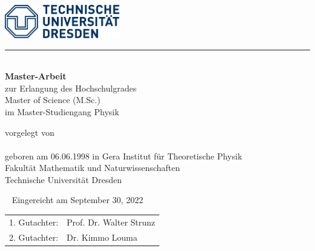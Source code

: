 \makeatletter
\thispagestyle{empty}
\begin{titlepage}
  \includegraphics[width=5cm]{figs/logo.pdf}
  \hrule
  \vspace{1em}

  {\centering
  \vspace*{5em}
  {\bfseries\Huge \@title\\}
  \vspace*{2em}
  {\Large\@subtitle}
    \vfill \vfill
    {\large {\bfseries Master-Arbeit} \\
      zur Erlangung des Hochschulgrades\\
      Master of Science (M.Sc.)\\
      im Master-Studiengang Physik}

    \vfill
      {vorgelegt von\\
      {\large \@author}\\
      geboren am 06.06.1998 in Gera}
  \vfill
  {\large Institut f\"ur Theoretische Physik\\
    Fakultät Mathematik und Naturwissenschaften\\
    Technische Universität Dresden \\}
}

\newpage \thispagestyle{empty}\ \newpage
\clearpage
\thispagestyle{empty}
\null\vfill
{\large Eingereicht am September 30, 2022}

\begin{tabular*}{.5\linewidth}[h]{ll}
  1. Gutachter: & Prof. Dr. Walter Strunz \\
  2. Gutachter: & Dr. Kimmo Louma \\
\end{tabular*}
\end{titlepage}
\makeatother
